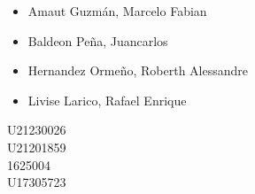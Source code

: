 \begin{titlepage}
\begin{minipage}{13cm}
    \begin{spacing}{1}
      \LARGE
      \begin{itemize}
        \item {Amaut Guzmán, Marcelo Fabian }
        \item {Baldeon Peña, Juancarlos }
        \item {Hernandez Ormeño, Roberth Alessandre }
        \item {Livise Larico, Rafael Enrique }
      \end{itemize}
    \end{spacing}
  \end{minipage}
  \begin{minipage}{4.5cm}
    \LARGE
    \begin{spacing}{1}
      \vspace{0.8cm}
      {U21230026}\\
      {U21201859}\\
      {1625004}\\
      {U17305723}\\
    \end{spacing}
  \end{minipage}

\end{titlepage}